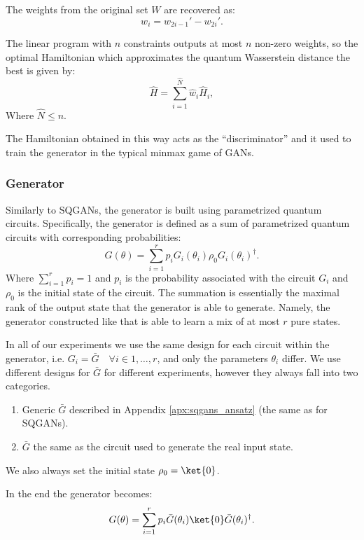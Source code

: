 The weights from the original set $W$ are recovered as:
\begin{equation}
  w_i = w_{2i-1}' - w_{2i}'.
\end{equation}


The linear program with $n$ constraints outputs at most $n$ non-zero
weights\cite{10.5555/548834}, so the optimal Hamiltonian which approximates the
quantum Wasserstein distance the best is given by:
\begin{equation}
\hat{H} = \sum_{i=1}^{\hat{N}}\hat{w}_i\hat{H}_i,
\end{equation}
Where $\hat{N} \leq n$.

The Hamiltonian obtained in this way acts as the ``discriminator'' and it used
to train the generator in the typical minmax game of GANs.

\subsubsection{Generator}
Similarly to SQGANs, the generator is built using parametrized quantum circuits.
Specifically, the generator is defined as a sum of parametrized quantum circuits
with corresponding probabilities:
\begin{equation}
G(\theta) = \sum_{i=1}^r p_iG_i(\theta_i)\rho_0G_i(\theta_i)^\dagger.
\end{equation}
Where $\sum_{i=1}^r p_i = 1$ and $p_i$ is the probability associated with the
circuit $G_i$ and $\rho_0$ is the initial state of the circuit. The summation is
essentially the maximal rank of the output state that the generator is able to
generate. Namely, the generator constructed like that is able to learn a mix of
at most $r$ pure states.

In all of our experiments we use the same design for each circuit within the
generator, i.e. $G_i = \bar{G} \quad \forall i \in 1,\ldots, r$, and only the
parameters $\theta_i$ differ. We use different designs for $\bar{G}$ for
different experiments, however they always fall into two categories.
\begin{enumerate}
\item Generic $\bar{G}$ described in Appendix \ref{apx:sqgans_ansatz} (the same as for SQGANs).
\item $\bar{G}$ the same as the circuit used to generate the real input state.
\end{enumerate}
We also always set the initial state $\rho_0 = \ket{0}$.

In the end the generator becomes:
\begin{equation}
  G(\theta) = \sum_{i=1}^r p_i\bar{G}(\theta_i)\ket{0}\bar{G}(\theta_i)^\dagger.
\end{equation}



